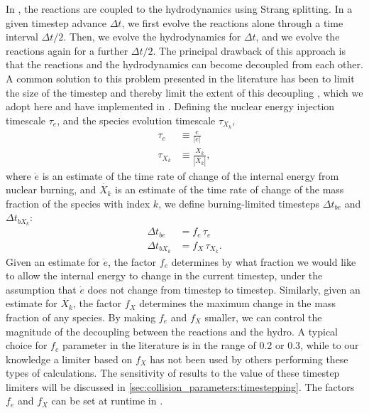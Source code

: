 \documentclass[12pt]{article}
\begin{document}
In \castro, the reactions are coupled to the hydrodynamics using Strang splitting.
In a given timestep advance $\Delta t$, we first evolve the reactions alone through
a time interval $\Delta t / 2$. Then, we evolve the hydrodynamics for $\Delta t$,
and we evolve the reactions again for a further $\Delta t / 2$. The principal
drawback of this approach is that the reactions and the hydrodynamics can become
decoupled from each other. A common solution to this problem presented in
the literature has been to limit the size of the timestep and thereby limit the
extent of this decoupling \citep{raskin:2010,hawley:2012}, which we adopt here 
and have implemented in \castro. Defining the nuclear energy injection timescale 
$\tau_e$, and the species evolution timescale $\tau_{X_k}$,
\begin{align}
  \tau_e &\equiv \frac{e}{|\dot{e}|} \\
  \tau_{X_k} &\equiv \frac{X_k}{|\dot{X_k}|},
\end{align}
where $\dot{e}$ is an estimate of the time rate of change of the internal energy
from nuclear burning, and $\dot{X_k}$ is an estimate of the time rate of change 
of the mass fraction of the species with index $k$, we define burning-limited 
timesteps $\Delta t_{be}$ and $\Delta t_{bX_k}$:
\begin{align}
  \Delta t_{be} &= f_{e}\, \tau_e \label{eq:timestep_e}\\
  \Delta t_{bX_k} &= f_{X}\, \tau_{X_k}. \label{eq:timestep_X}
\end{align}
Given an estimate for $\dot{e}$, the factor $f_{e}$ determines by what 
fraction we would like to allow the internal energy to change
in the current timestep, under the assumption that $\dot{e}$ does not change from
timestep to timestep. Similarly, given an estimate for $\dot{X_k}$, the factor $f_{X}$ 
determines the maximum change in the mass fraction of any species. By making 
$f_{e}$ and $f_{X}$ smaller, we can control the magnitude of the decoupling 
between the reactions and the hydro. A typical choice for $f_e$ parameter in the
literature is in the range of 0.2 or 0.3, while to our knowledge a limiter based on
$f_X$ has not been used by others performing these types of calculations. The sensitivity
of results to the value of these timestep limiters will be discussed in
\autoref{sec:collision_parameters:timestepping}. The factors $f_{e}$ and $f_{X}$ can be set at runtime in \castro.
\end{document}
